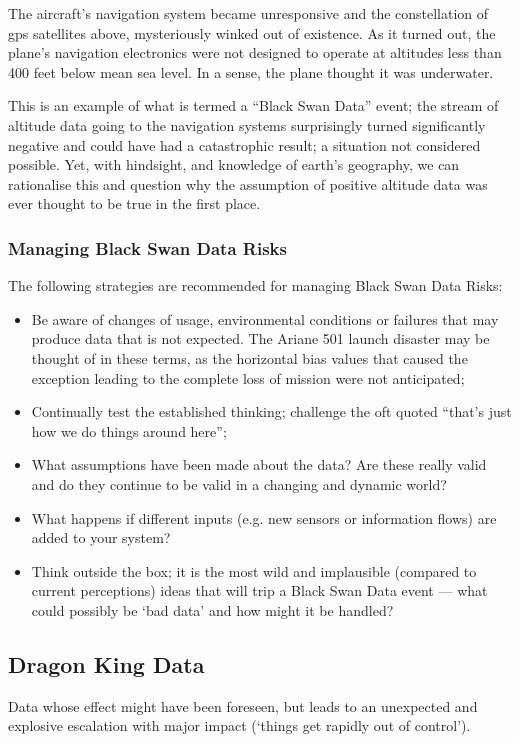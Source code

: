 The aircraft's navigation system became unresponsive and the constellation of \gls{gps} satellites above, mysteriously winked out of existence. As it turned out, the plane's navigation electronics were not designed to operate at altitudes less than 400 feet below mean sea level. In a sense, the plane thought it was underwater.

This is an example of what is termed a “Black Swan Data” event; the stream of altitude data going to the navigation systems surprisingly turned significantly negative and could have had a catastrophic result; a situation not considered possible. Yet, with hindsight, and knowledge of earth’s geography, we can rationalise this and question why the assumption of positive altitude data was ever thought to be true in the first place.

\subsubsection{Managing Black Swan Data Risks}
The following strategies are recommended for managing Black Swan Data Risks:
\begin{itemize}
\item Be aware of changes of usage, environmental conditions or failures that may produce data
that is not expected.
The Ariane 501 launch disaster may be thought of in these terms,
as the horizontal bias values that caused the exception leading to the complete loss of mission
were not anticipated;
\item Continually test the established thinking; challenge the oft quoted
“that’s just how we do things around here”;
\item What assumptions have been made about the data?
Are these really valid and do they continue to be valid in a changing and dynamic world?
\item What happens if different inputs (e.g. new sensors or information flows)
are added to your system?
\item Think outside the box;
it is the most wild and implausible (compared to current perceptions)
ideas that will trip a Black Swan Data event ---
what could possibly be ‘bad data’ and how might it be handled?
\end{itemize}

\subsection{Dragon King Data}
 Data whose effect might have been foreseen, but leads to an unexpected and explosive escalation
with major impact (‘things get rapidly out of control’).

